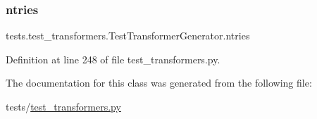 \subsubsection{\texorpdfstring{ntries}{ntries}}
{\footnotesize\ttfamily tests.\+test\+\_\+transformers.\+Test\+Transformer\+Generator.\+ntries\hspace{0.3cm}{\ttfamily [static]}}



Definition at line 248 of file test\+\_\+transformers.\+py.



The documentation for this class was generated from the following file\+:\begin{DoxyCompactItemize}
\item 
tests/\hyperlink{test__transformers_8py}{test\+\_\+transformers.\+py}\end{DoxyCompactItemize}
